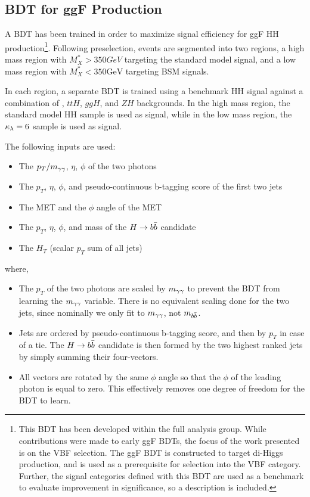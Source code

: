 \subsection{BDT for ggF Production} \label{ssec:ggf-bdt}
A \gls{BDT} has been trained in order to maximize signal efficiency for ggF HH production\footnote{This \gls{BDT} has been developed within the full \hhyybb analysis group. While contributions were made to early \gls{ggF} BDTs, the focus of the work presented is on the \gls{VBF} selection. The \gls{ggF} \gls{BDT} is constructed to target di-Higgs production, and is used as a prerequisite for selection into the \gls{VBF} category. Further, the signal categories defined with this \gls{BDT} are used as a benchmark to evaluate improvement in significance, so a description is included.}. Following preselection, events are segmented into two regions, a high mass region with $M_X^{*} > \unit{350}{GeV}$ targeting the standard model signal, and a low mass region with $M_X^{*} < 350 \text{GeV}$ targeting BSM signals. 


In each region, a separate BDT is trained using a benchmark HH signal against a combination of \yy, $ttH$, $ggH$, and $ZH$ backgrounds. In the high mass region, the standard model HH sample is used as signal, while in the low mass region, the $\kappa_{\lambda} = 6$ sample is used as signal.

The following inputs are used:

\begin{itemize}
	\item{The $p_{T}/m_{\gamma\gamma}$, $\eta$, $\phi$ of the two photons} 
	\item{The $p_{T}$, $\eta$, $\phi$, and pseudo-continuous b-tagging score of the first two jets}
	\item{The MET and the $\phi$ angle of the MET}
	\item{The $p_{T}$, $\eta$, $\phi$, and mass of the $H\rightarrow b\bar{b}$ candidate}
	\item{The $H_{T}$ (scalar $p_{T}$ sum of all jets)}
\end{itemize}
where,
\begin{itemize}
	\item{The $p_{T}$ of the two photons are scaled by $m_{\gamma\gamma}$ to prevent the BDT from learning the $m_{\gamma\gamma}$ variable. There is no equivalent scaling done for the two jets, since nominally we only fit to $m_{\gamma\gamma}$, not $m_{b\bar{b}}$.}
	\item{Jets are ordered by pseudo-continuous b-tagging score, and then by $p_{T}$ in case of a tie. The $H \rightarrow b\bar{b}$ candidate is then formed by the two highest ranked jets by simply summing their four-vectors.}
	\item{All vectors are rotated by the same $\phi$ angle so that the $\phi$ of the leading photon is equal to zero. This effectively removes one degree of freedom for the BDT to learn.}
\end{itemize}

